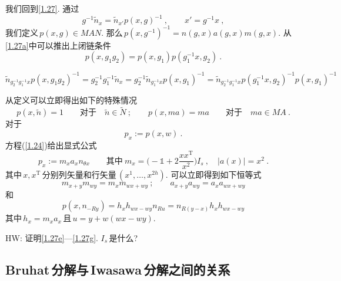 我们回到\eqref{1.27}. 通过
\begin{equation}
    g^{-1}\tilde{n}_{x}=\tilde{n}_{x'}p(x,g)^{-1}\:, \qquad x'=g^{-1}x \:, \tag{1.27a}\label{1.27a}
\end{equation}
我们定义$\,p(x,g)\in MAN$. 那么$\,p(x,g^{-1})^{-1}=n(g,x)a(g,x)m(g,x)$. 从\eqref{1.27a}中可以推出上闭链条件
\begin{equation}
    p(x,g_{1}g_{2})=p(x,g_{1})p(g_{1}^{-1}x,g_{2}) \:. \label{1.27b} \tag{1.27b}
\end{equation}
\begin{tcolorbox}
   \begin{equation*}
    \tilde{n}_{g_{2}^{-1}g_{1}^{-1}x}p(x,g_{1}g_{2})^{-1}=g_{2}^{-1}g_{1}^{-1}\tilde{n}_{x}
    =g_{2}^{-1}\tilde{n}_{g_{1}^{-1}x}p(x,g_{1})^{-1}=\tilde{n}_{g_{2}^{-1}g_{1}^{-1}x}p(g_{1}^{-1}x,g_{2})^{-1}p(x,g_{1})^{-1}
   \end{equation*} 
\end{tcolorbox}
\noindent 从定义可以立即得出如下的特殊情况
\begin{equation}
    p(x,\tilde{n})=1 \qquad \text{对于}\quad \tilde{n}\in\tilde{N}\:; \qquad
    p(x,ma)=ma \qquad \text{对于}\quad ma\in MA \:. \label{1.27c} \tag{1.27b}
\end{equation}
对于
\begin{equation}
    p_{x}:=p(x,w) \:. \label{1.27d} \tag{1.27d}
\end{equation}
方程(\ref{1.24})给出显式公式
\begin{equation}
    p_{x}:=m_{x}a_{x}n_{\theta x} \qquad \text{其中} \:
    m_{x}=\biggl(-\mathds{1}+2\frac{xx^{\mathrm{T}}}{x^{2}}\biggr)I_{s}\:,\quad \lvert a(x)\rvert =x^{2} \:. 
    \label{1.27e} \tag{1.27e}
\end{equation}
其中$\,x,x^{\mathrm{T}}\,$分别列矢量和行矢量$\,(x^{1},\ldots,x^{2h})$. 可以立即得到如下恒等式
\begin{equation}
m_{x+y}m_{wy}=m_{x}m_{wx+wy}\:; \qquad a_{x+y}a_{wy}=a_{x}a_{wx+wy} \label{1.27f} \tag{1.27f}
\end{equation}
和
\begin{equation}
p(x,n_{-Ry})=h_{x}h_{wx-wy}n_{Ru} =n_{R(y-x)}h_{x}h_{wx-wy} \label{1.27g} \tag{1.27g}
\end{equation}
其中$\,h_{x}=m_{x}a_{x}\,$且$\,u=y+w(wx-wy)$.
\begin{note}
    HW: 证明\eqref{1.27e}---\eqref{1.27g}. $I_{s}\,$是什么?
\end{note}

\subsection{Bruhat\,分解与\,Iwasawa\,分解之间的关系}
